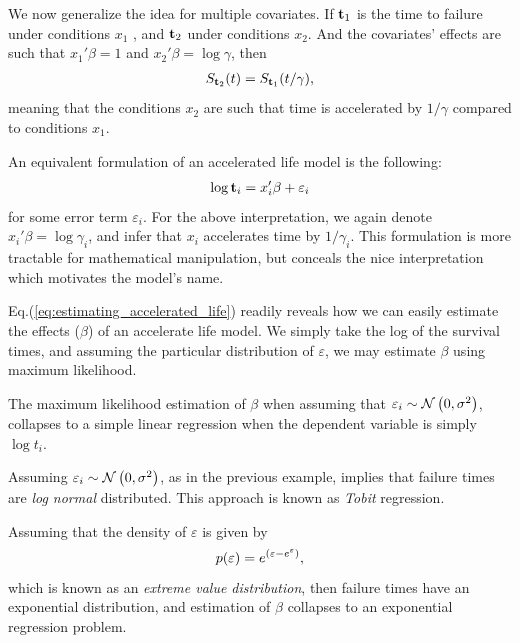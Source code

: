 We now generalize the idea for multiple covariates.
If $\mathbf{t}_1$ is the time to failure under conditions $x_1$ , and $\mathbf{t}_2$ under conditions $x_2$. 
And the covariates' effects are such that $x_1' \beta=1$ and $x_2' \beta=\log \gamma$,  then 
\begin{align}
\label{eq:accelerated_life}
	S_{\mathbf{t}_2} (t)=S_{\mathbf{t}_1} (t/\gamma),
\end{align}
meaning that the conditions $x_2$ are such that time is accelerated by $1/\gamma$ compared to conditions $x_1$.


An equivalent formulation of an accelerated life model is the following:
\begin{align}
\label{eq:estimating_accelerated_life}
	\log \mathbf{t}_i = x_i'\beta + \varepsilon_i
\end{align}
for some error term $\varepsilon_i$. 
For the above interpretation, we again denote $x_i'\beta= \log \gamma_i$, and infer that $x_i$ accelerates time by $1/\gamma_i$. 
This formulation is more tractable for mathematical manipulation, but conceals the nice interpretation which motivates the model's name.

Eq.(\ref{eq:estimating_accelerated_life}) readily reveals how we can easily estimate the effects ($\beta$) of an accelerate life model.
We simply take the log of the survival times, and assuming the particular distribution of $\varepsilon$, we may estimate $\beta$ using maximum likelihood.



\begin{example}
The maximum likelihood estimation of $\beta$ when assuming that $\varepsilon_i \sim \mathcal{N}\left(0,\sigma^2\right)$, collapses to a simple linear regression when the dependent variable is simply $\log t_i$.
\end{example}


\begin{extra}
Assuming $\varepsilon_i \sim \mathcal{N}\left(0,\sigma^2\right)$, as in the previous example, implies that failure times are \emph{log normal} distributed. 
This approach is known as \emph{Tobit} regression.
\end{extra}


\begin{example}
Assuming that the density of $\varepsilon$ is given by 
$$
	p(\varepsilon)=e^{(\varepsilon-e^\varepsilon)}, 
$$
which is known as an \emph{extreme value distribution}, then failure times have an exponential distribution, and estimation of $\beta$ collapses to an exponential regression problem.
\end{example}





